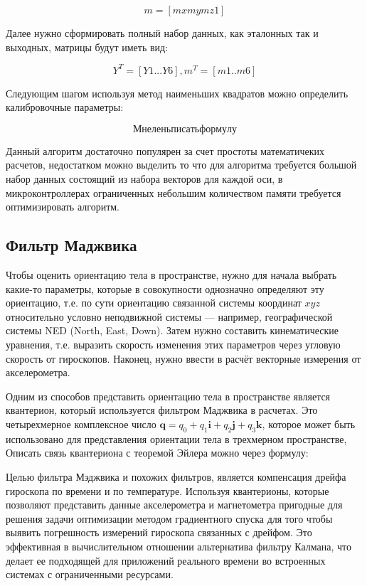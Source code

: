 $$ m = [mx my mz 1]$$

Далее нужно сформировать полный набор данных, как эталонных так и выходных, матрицы будут иметь вид:

$$ 
Y^T = [Y1...Y6],
m^T = [m1..m6]
$$

Следующим шагом используя метод наименьших квадратов можно определить калибровочные параметры:

$$  Мне лень писать формулу $$

Данный алгоритм достаточно популярен за счет простоты математичеких расчетов, недостатком можно выделить то что 
для алгоритма требуется большой набор данных состоящий из набора векторов для каждой оси, в микроконтроллерах ограниченных небольшим 
количеством памяти требуется оптимизировать алгоритм. 

\subsection{Фильтр Маджвика}

Чтобы оценить ориентацию тела в пространстве, нужно для начала выбрать какие-то параметры, 
которые в совокупности однозначно определяют эту ориентацию, т.е. по сути ориентацию связанной 
системы координат $xyz$ относительно условно неподвижной системы — например, географической системы NED (North, East, Down). 
Затем нужно составить кинематические уравнения, т.е. выразить скорость изменения этих параметров через угловую скорость от 
гироскопов. Наконец, нужно ввести в расчёт векторные измерения от акселерометра.

Одним из способов представить ориентацию тела в пространстве является квантерион, который используется фильтром Маджвика в расчетах.
Это четырехмерное комплексное число $\mathbf{q}=q_{0}+q_{1}\mathbf{i}+q_{2}\mathbf{j}+q_{3}\mathbf{k}$, которое может быть использовано 
для представления ориентации тела в трехмерном пространстве,
Описать связь квантериона с теоремой Эйлера можно через формулу: 


Целью фильтра Мэджвика и похожих фильтров, является компенсация дрейфа гироскопа по времени и по температуре.
Используя квантерионы, которые позволяют представить данные акселерометра и магнетометра пригодные для решения задачи оптимизации 
методом градиентного спуска для того чтобы выявить погрешность измерений гироскопа связанных с дрейфом. Это эффективная в 
вычислительном отношении альтернатива фильтру Калмана, что делает ее подходящей для приложений реального времени во встроенных 
системах с ограниченными ресурсами. 

